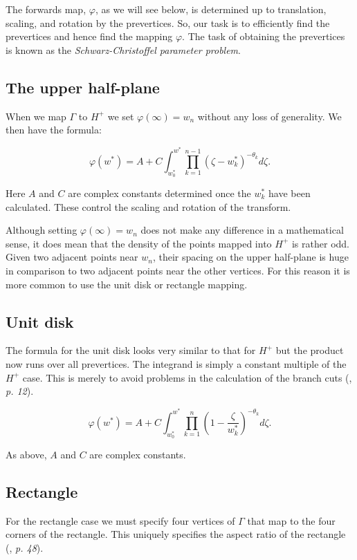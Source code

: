 \documentclass[a4paper,10pt]{amsart}
\newcommand{\sch}{Schwarz-Christoffel }
\renewcommand{\phi}{\varphi}
\begin{document}
The forwards map, $\phi$, as we will see below, is determined up to translation, scaling, and rotation by the prevertices. So, our task is to efficiently find the prevertices and hence find the mapping $\phi$. The task of obtaining the prevertices is known as the \emph{\sch parameter problem}.


\subsection{The upper half-plane}

When we map $\Gamma$ to $H^+$ we set $\phi(\infty) = w_n$ without any loss of generality. We then have the formula:

\begin{equation}
\phi(w^*) = A + C \int^{w^*}_{w^*_0} \prod_{k=1}^{n-1} (\zeta-w^*_k)^{-\theta_k} d\zeta.
\end{equation}

Here $A$ and $C$ are complex constants determined once the $w^*_k$ have been calculated. These control the scaling and rotation of the transform.

Although setting $\phi(\infty) = w_n$ does not make any difference in a mathematical sense, it does mean that the density of the points mapped into $H^+$ is rather odd. Given two adjacent points near $w_n$, their spacing on the upper half-plane is huge in comparison to two adjacent points near the other vertices. For this reason it is more common to use the unit disk or rectangle mapping. 

\subsection{Unit disk}

The formula for the unit disk looks very similar to that for $H^+$ but the product now runs over all prevertices. The integrand is simply a constant multiple of the $H^+$ case. This is merely to avoid problems in the calculation of the branch cuts (\cite{driscoll}, \emph{p. 12}).

\begin{equation}
\label{unitscmap}
\phi(w^*) = A + C \int^{w^*}_{w^*_0} \prod_{k=1}^{n} (1 - \frac{\zeta}{w^*_k})^{-\theta_k} d\zeta.
\end{equation}

As above, $A$ and $C$ are complex constants.

\subsection{Rectangle}
For the rectangle case we must specify four vertices of $\Gamma$ that map to the four corners of the rectangle. This uniquely specifies the aspect ratio of the rectangle (\cite{driscoll}, \emph{p. 48}).
\end{document}
